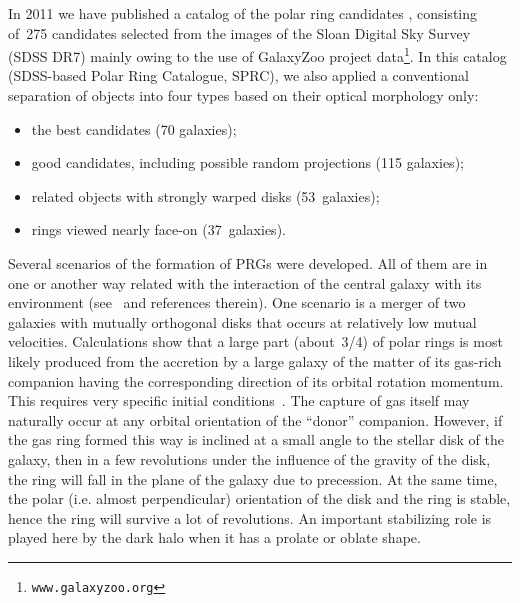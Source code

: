 \documentclass{ab}
\begin{document}
In 2011 we have published  a catalog
of the polar ring candidates \citep{Moiseev_SDSS}, consisting of~275 candidates
selected from the images of the Sloan Digital Sky Survey (SDSS
DR7) mainly owing to the use of GalaxyZoo project
data\footnote{\tt www.galaxyzoo.org}. In this catalog
(\mbox{SDSS-based} Polar Ring Catalogue, SPRC), we also applied a
conventional separation of objects into four types based on their
optical morphology only:
\begin{itemize}

\item  the best candidates  (70 galaxies);

\item good candidates, including possible random projections (115
galaxies);

\item  related objects with strongly warped disks \mbox{(53
galaxies)};

\item rings viewed nearly face-on (37~galaxies).
\end{itemize}







Several scenarios of the formation of PRGs were developed. All of
them are in one or another way related with the interaction of the
central galaxy with its environment
(see~\citet{Combes03,Combes06} and references
therein). One scenario is a merger of two galaxies with mutually
orthogonal disks that occurs at relatively low mutual velocities.
Calculations show that a large part (about~3/4) of polar rings is
most likely produced from the accretion by a large galaxy of the
matter of its gas-rich companion having the corresponding
direction of its orbital rotation momentum. This requires very
specific initial
conditions~\citep{ReshetnikovSotnikova1997,Combes03}.
The capture of gas itself may  naturally occur at any orbital
orientation of the ``donor'' companion. However, if the gas ring
formed this way is inclined at a small angle to the stellar disk
of the galaxy, then in a few revolutions under the influence of
the gravity of the disk, the ring will fall in the plane of the
galaxy due to precession. At the same time, the polar (i.e. almost
perpendicular) orientation of the disk and the ring is stable,
hence the ring will survive a lot of revolutions. An important
stabilizing role is played here by the dark halo when
it has a prolate or oblate shape.
\end{document}
